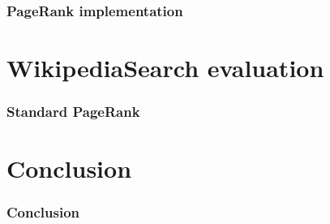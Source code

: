 \documentclass{beamer}
\begin{document}
	\begin{frame}
		\frametitle{PageRank implementation}
	\end{frame}

	\section{WikipediaSearch evaluation}
	
	\begin{frame}
		\frametitle{Standard PageRank}
	\end{frame}
	
	\section{Conclusion}
		
	\begin{frame}
		\frametitle{Conclusion}
	\end{frame}
	
\end{document}

